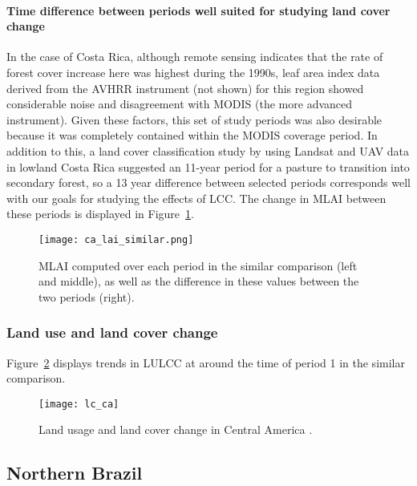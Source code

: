 \paragraph{Time difference between periods well suited for studying land cover change}

In the case of Costa Rica, although remote sensing indicates that the rate of forest cover increase here was highest during the 1990s, leaf area index data derived from the \ac{AVHRR} instrument (not shown) for this region showed considerable noise and disagreement with \ac{MODIS} (the more advanced instrument). Given these factors, this set of study periods was also desirable because it was completely contained within the \ac{MODIS} coverage period. In addition to this, a land cover classification study by \citet{marx2017} using Landsat and \ac{UAV} data in lowland Costa Rica suggested an 11-year period for a pasture to transition into secondary forest, so a 13 year difference between selected periods corresponds well with our goals for studying the effects of \ac{LCC}. The change in \ac{MLAI} between these periods is displayed in Figure~\ref{fig:ca_lai_similar}.

\begin{figure}[!ht]
	\centering
	\texttt{[image: ca\_lai\_similar.png]}
	\caption[MLAI similar comparison for CA focus region]{\ac{MLAI} computed over each period in the similar comparison (left and middle), as well as the difference in these values between the two periods (right).}
	\label{fig:ca_lai_similar}
\end{figure}

\subsubsection{Land use and land cover change}

Figure~\ref{fig:lc_ca} displays trends in \ac{LULCC} at around the time of period 1 in the similar comparison.

\begin{figure}[!ht]
	\centering
	\texttt{[image: lc\_ca]}
	\caption[Central America Land Usage]{Land usage and land cover change in Central America \citep{ipcc_2007}.}
	\label{fig:lc_ca}
\end{figure}

\subsection{Northern Brazil}

